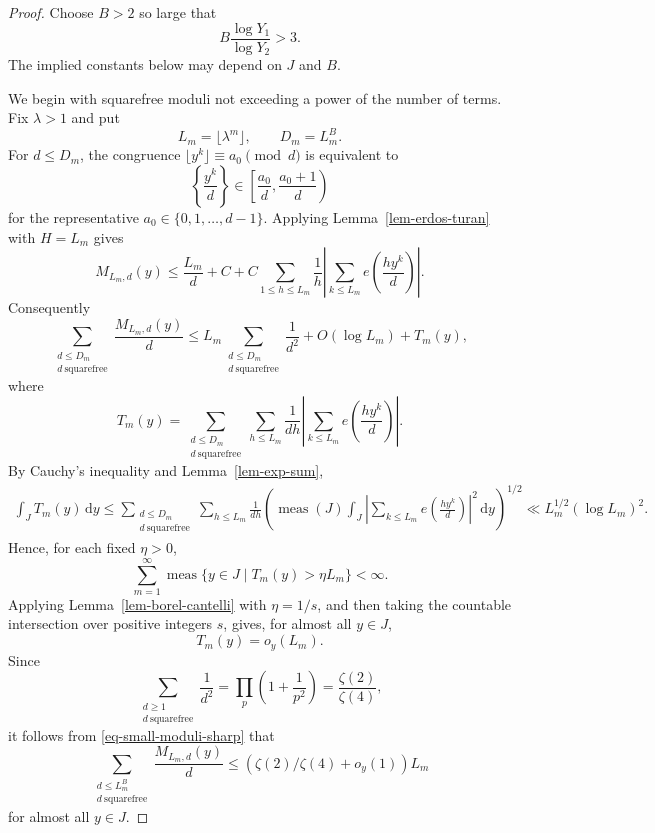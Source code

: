 \documentclass[10pt,a4paper]{amsart}
\begin{document}
    \begin{proof}
        Choose $B>2$ so large that
        \begin{equation}\label{eq-B-choice}
            B\frac{\log Y_1}{\log Y_2}>3.
        \end{equation}
        The implied constants below may depend on $J$ and $B$.

        We begin with squarefree moduli not exceeding a power of the number of terms. Fix $\lambda>1$ and put
        $$
        L_m=\lfloor \lambda^m\rfloor,\qquad D_m=L_m^B.
        $$
        For $d\le D_m$, the congruence $\lfloor y^k\rfloor\equiv a_0\pmod d$ is equivalent to
        $$
        \left\{\frac{y^k}{d}\right\}\in
        \left[\frac{a_0}{d},\frac{a_0+1}{d}\right)
        $$
        for the representative $a_0\in\{0,1,\ldots,d-1\}$. Applying Lemma~\ref{lem-erdos-turan} with $H=L_m$ gives
        $$
        M_{L_m,d}(y)
        \le \frac{L_m}{d}
        +C
        +C\sum_{1\le h\le L_m}\frac1h
        \left|\sum_{k\le L_m}e\left(\frac{h y^k}{d}\right)\right|.
        $$
        Consequently
        \begin{equation}\label{eq-small-moduli-sharp}
            \sum_{\substack{d\le D_m\\ d\ \mathrm{squarefree}}}\frac{M_{L_m,d}(y)}d
            \le L_m\sum_{\substack{d\le D_m\\ d\ \mathrm{squarefree}}}\frac1{d^2}+O(\log L_m)+T_m(y),
        \end{equation}
        where
        $$
        T_m(y)=\sum_{\substack{d\le D_m\\ d\ \mathrm{squarefree}}}\sum_{h\le L_m}\frac1{dh}
        \left|\sum_{k\le L_m}e\left(\frac{h y^k}{d}\right)\right|.
        $$
        By Cauchy's inequality and Lemma~\ref{lem-exp-sum},
        \begin{align*}
            \int_J T_m(y)\,\mathrm{d}y\!
            \le
            \sum_{\substack{d\le D_m\\ d\ \mathrm{squarefree}}}\sum_{h\le L_m}\frac{1}{dh}
            \left(\operatorname{meas}(J)\int_J\left|\sum_{k\le L_m}e\left(\frac{h y^k}{d}\right)\right|^2\,\mathrm{d}y\right)^{1/2} 
            \!\ll L_m^{1/2}(\log L_m)^2.
        \end{align*}
        Hence, for each fixed $\eta>0$,
        $$
        \sum_{m=1}^{\infty}
        \operatorname{meas}\{y\in J\mid T_m(y)>\eta L_m\}<\infty.
        $$
        Applying Lemma~\ref{lem-borel-cantelli} with $\eta=1/s$, and then taking the countable intersection over positive integers $s$, gives, for almost all $y\in J$,
        $$
        T_m(y)=o_y(L_m).
        $$
        Since
        $$
        \sum_{\substack{d\ge1\\ d\ \mathrm{squarefree}}}\frac1{d^2}
        =\prod_p\left(1+\frac1{p^2}\right)
        =\frac{\zeta(2)}{\zeta(4)},
        $$
        it follows from \eqref{eq-small-moduli-sharp} that
        $$
        \sum_{\substack{d\le L_m^B\\ d\ \mathrm{squarefree}}}\frac{M_{L_m,d}(y)}d
        \le (\zeta(2)/\zeta(4)+o_y(1))L_m
        $$
        for almost all $y\in J$.


\end{proof}
\end{document}
